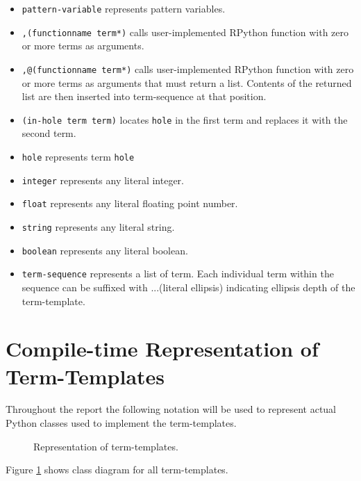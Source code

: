 \begin{itemize}
\item 
\texttt{pattern-variable} represents pattern variables.
\item
\texttt{,(functionname term*)} calls user-implemented RPython function with zero or more terms as arguments.
\item
\texttt{,@(functionname term*)} calls user-implemented RPython function with zero or more terms as arguments that must return a list. Contents of the returned list are then inserted into term-sequence at that position. 
\item
\texttt{(in-hole term term)} locates \lstinline{hole} in the first term and replaces it with the second term.
\item
\texttt{hole} represents term \lstinline{hole}
\item
\texttt{integer} represents any literal integer.
\item
\texttt{float} represents any literal floating point number.
\item
\texttt{string}  represents any literal string.
\item
\texttt{boolean}  represents any literal boolean.
\item
\texttt{term-sequence} represents a list of term.  Each individual term within the sequence can be suffixed with ...(literal ellipsis) indicating ellipsis depth of the term-template.
\end{itemize}

\section{Compile-time Representation of Term-Templates}

Throughout the report the following notation will be used to represent actual Python classes used to implement the term-templates. 

\begin{figure}[H]
	\centering
	\caption{Representation of term-templates.}
\label{class-diagram-termtemplate}
\end{figure}

Figure \ref{class-diagram-termtemplate} shows class diagram for all term-templates.


